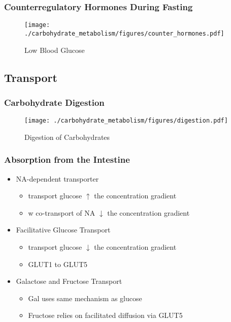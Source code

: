 \documentclass{scrartcl}
\begin{document}
\subsubsection{Counterregulatory Hormones During Fasting}
\label{sec:org1ac74b4}

\begin{figure}[htbp]
\centering
\texttt{[image: ./carbohydrate\_metabolism/figures/counter\_hormones.pdf]}
\caption{\label{fig:org575263f}
Low Blood Glucose}
\end{figure}

\subsection{Transport}
\label{sec:orge9d7779}
\subsubsection{Carbohydrate Digestion}
\label{sec:orgc8f3dcb}

\begin{figure}[htbp]
\centering
\texttt{[image: ./carbohydrate\_metabolism/figures/digestion.pdf]}
\caption{\label{fig:orgcca6ca2}
Digestion of Carbohydrates}
\end{figure}

\subsubsection{Absorption from the Intestine}
\label{sec:org35d636f}
\begin{itemize}
\item NA-dependent transporter
\begin{itemize}
\item transport glucose \(\uparrow\) the concentration gradient
\item w co-transport of NA \(\downarrow\) the concentration gradient
\end{itemize}
\item Facilitative Glucose Transport
\begin{itemize}
\item transport glucose \(\downarrow\) the concentration gradient
\item GLUT1 to GLUT5
\end{itemize}
\item Galactose and Fructose Transport
\begin{itemize}
\item Gal uses same mechanism as glucose
\item Fructose relies on facilitated diffusion via GLUT5
\end{itemize}
\end{itemize}
\end{document}
